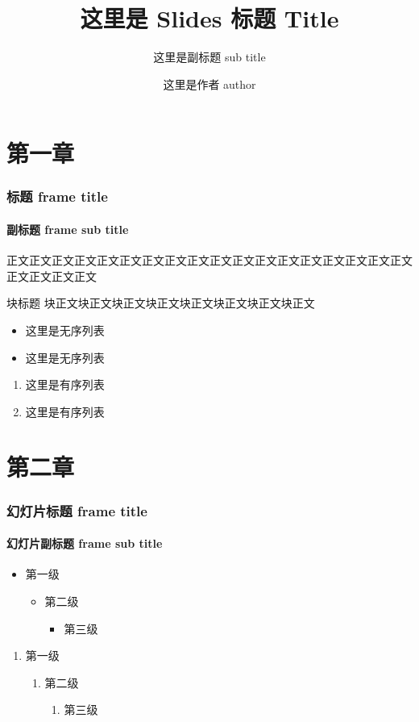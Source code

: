 \documentclass[12pt]{beamer}
\title{这里是 Slides 标题 Title}
\subtitle{这里是副标题 sub title}
\author{这里是作者 author}
\institute{这里是学院 institute}
\begin{document}
\maketitle


\section{第一章}

\begin{frame}[t]
    \frametitle{标题 frame title}
    \framesubtitle{副标题 frame sub title}

    正文正文正文正文正文正文正文正文正文正文正文正文正文正文正文正文正文正文正文正文正文正文

    \begin{block}{块标题}
        块正文块正文块正文块正文块正文块正文块正文块正文
    \end{block}

    \begin{itemize}
        \item 这里是无序列表
        \item 这里是无序列表
    \end{itemize}

    \begin{enumerate}
        \item 这里是有序列表
        \item 这里是有序列表
    \end{enumerate}

\end{frame}

\section{第二章}


\begin{frame}[t]
    \frametitle{幻灯片标题 frame title}
    \framesubtitle{幻灯片副标题 frame sub title}

    \begin{itemize}
        \item 第一级
        \begin{itemize}
            \item 第二级
            \begin{itemize}
                \item 第三级
            \end{itemize}
        \end{itemize}
    \end{itemize}

    \begin{enumerate}
        \item 第一级
        \begin{enumerate}
            \item 第二级
            \begin{enumerate}
                \item 第三级
            \end{enumerate}
        \end{enumerate}
    \end{enumerate}

\end{frame}
\end{document}
